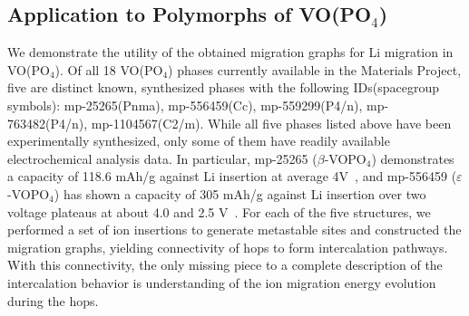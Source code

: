 \documentclass[reprint,preprintnumbers,amsmath,amssymb,aps,prl]{revtex4-1}
\begin{document}





%

\subsection{Application to Polymorphs of VO(PO$_4$)}
We demonstrate the utility of the obtained migration graphs for Li migration in VO(PO$_4$).
Of all 18 VO(PO$_4$) phases currently available in the Materials Project, five are distinct known, synthesized phases with the following IDs(spacegroup symbols):
mp-25265(Pnma), 
mp-556459(Cc), 
mp-559299(P4/n), 
mp-763482(P4/n),
mp-1104567(C2/m).
While all five phases listed above have been experimentally synthesized, only some of them have readily available electrochemical analysis data. In particular, mp-25265 ($\beta$-VOPO$_4$) demonstrates a capacity of 118.6 mAh/g against Li insertion at average 4V~\cite{Ren2009Apr}, and mp-556459 ($\varepsilon$-VOPO$_4$) has shown a capacity of 305 mAh/g against Li insertion over two voltage plateaus at about 4.0 and 2.5 V~\cite{Siu2018}.
For each of the five structures, we performed a set of ion insertions to generate metastable sites and constructed the migration graphs, yielding connectivity of hops to form intercalation pathways. With this connectivity, the only missing piece to a complete description of the intercalation behavior is understanding of the ion migration energy evolution during the hops.
\end{document}
